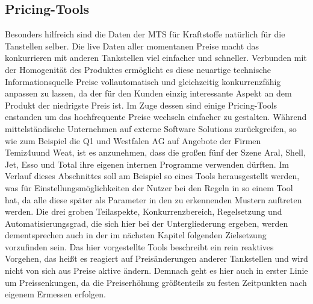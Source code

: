 \documentclass[12pt,a4paper,bibliography=totocnumbered,listof=totocnumbered]{scrartcl}
\begin{document}
\subsection{Pricing-Tools}

Besonders hilfreich sind die Daten der MTS für Kraftstoffe natürlich für die Tanstellen selber. Die live Daten aller momentanen Preise macht das konkurrieren mit anderen Tankstellen viel einfacher und schneller. Verbunden mit der Homogenität des Produktes ermöglicht es diese neuartige technische Informationsquelle Preise vollautomatisch und gleichzeitig konkurrenzfähig anpassen zu lassen, da der für den Kunden einzig interessante Aspekt an dem Produkt der niedrigste Preis ist. Im Zuge dessen sind einige Pricing-Tools enstanden um das hochfrequente Preise wechseln einfacher zu gestalten. Während mittelständische Unternehmen auf externe Software Solutions zurückgreifen, so wie zum Beispiel die Q1 und Westfalen AG auf Angebote der Firmen Temiz4u\footnotemark[1] und Weat\footnotemark[2], ist es anzunehmen, dass die großen fünf der Szene Aral, Shell, Jet, Esso und Total ihre eigenen internen Programme verwenden dürften. Im Verlauf dieses Abschnittes soll am Beispiel so eines Tools herausgestellt werden, was für Einstellungsmöglichkeiten der Nutzer bei den Regeln in so einem Tool hat, da alle diese später als Parameter in den zu erkennenden Mustern auftreten werden. Die drei groben Teilaspekte, Konkurrenzbereich, Regelsetzung und Automatisierungsgrad, die sich hier bei der Untergliederung ergeben, werden dementsprechen auch in der im nächsten Kapitel folgenden Zielsetzung vorzufinden sein. Das hier vorgestellte Tools beschreibt ein rein reaktives Vorgehen, das heißt es reagiert auf Preisänderungen anderer Tankstellen und wird nicht von sich aus Preise aktive ändern. Demnach geht es hier auch in erster Linie um Preissenkungen, da die Preiserhöhung größtenteils zu festen Zeitpunkten nach eigenem Ermessen erfolgen.


\end{document}
